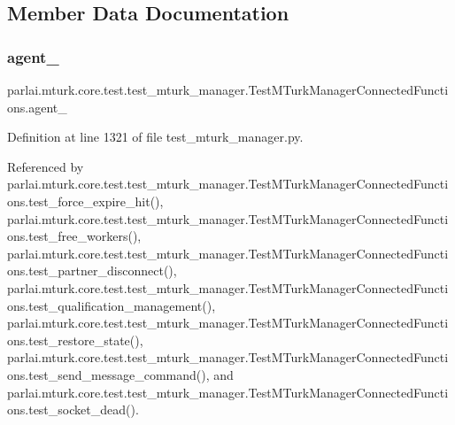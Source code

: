 \subsection{Member Data Documentation}
\mbox{\label{classparlai_1_1mturk_1_1core_1_1test_1_1test__mturk__manager_1_1TestMTurkManagerConnectedFunctions_a5ea436b204f4d8f9d1033f3b6b386c8f}} 
\subsubsection{\texorpdfstring{agent\+\_}{agent\_1}}
{\footnotesize\ttfamily parlai.\+mturk.\+core.\+test.\+test\+\_\+mturk\+\_\+manager.\+Test\+M\+Turk\+Manager\+Connected\+Functions.\+agent\+\_}



Definition at line 1321 of file test\+\_\+mturk\+\_\+manager.\+py.



Referenced by parlai.\+mturk.\+core.\+test.\+test\+\_\+mturk\+\_\+manager.\+Test\+M\+Turk\+Manager\+Connected\+Functions.\+test\+\_\+force\+\_\+expire\+\_\+hit(), parlai.\+mturk.\+core.\+test.\+test\+\_\+mturk\+\_\+manager.\+Test\+M\+Turk\+Manager\+Connected\+Functions.\+test\+\_\+free\+\_\+workers(), parlai.\+mturk.\+core.\+test.\+test\+\_\+mturk\+\_\+manager.\+Test\+M\+Turk\+Manager\+Connected\+Functions.\+test\+\_\+partner\+\_\+disconnect(), parlai.\+mturk.\+core.\+test.\+test\+\_\+mturk\+\_\+manager.\+Test\+M\+Turk\+Manager\+Connected\+Functions.\+test\+\_\+qualification\+\_\+management(), parlai.\+mturk.\+core.\+test.\+test\+\_\+mturk\+\_\+manager.\+Test\+M\+Turk\+Manager\+Connected\+Functions.\+test\+\_\+restore\+\_\+state(), parlai.\+mturk.\+core.\+test.\+test\+\_\+mturk\+\_\+manager.\+Test\+M\+Turk\+Manager\+Connected\+Functions.\+test\+\_\+send\+\_\+message\+\_\+command(), and parlai.\+mturk.\+core.\+test.\+test\+\_\+mturk\+\_\+manager.\+Test\+M\+Turk\+Manager\+Connected\+Functions.\+test\+\_\+socket\+\_\+dead().

